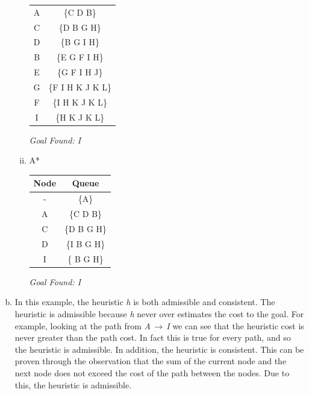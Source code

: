 \documentclass[12pt]{article}%
\begin{document}
\begin{enumerate}[(a)]
\begin{enumerate}[i.]
\begin{center}
\begin{tabular}{c | c}
            A & \{C D B\}  \\
            C & \{D B G H\}  \\
            D & \{B G I H\}  \\
            B & \{E G F I H\}  \\
            E & \{G F I H J\}  \\
            G & \{F I H K J K L\}  \\
            F & \{I H K J K L\}  \\
            I & \{H K J K L\}  \\ [1ex] %
            \hline %
        \end{tabular}\hfill\null
        \end{center}
        \begin{center}
            \textit{Goal Found: I}
        \end{center}
    \item
        A*
        \newline
        \begin{center}
        \hfill\begin{tabular}{c | c} %
            \hline\hline %
            Node & Queue \\ [0.5ex] %
            \hline %
            - & \{A\}  \\ %
            A & \{C D B\}  \\
            C & \{D B G H\}  \\
            D & \{I B G H\}  \\
            I & \{ B G H\}  \\ [1ex] %
            \hline %
        \end{tabular}\hfill\null
        \newline
        \end{center}
        \begin{center}
            \textit{Goal Found: I}
        \end{center}
  \end{enumerate}
  \item
  In this example, the heuristic \textit{h} is both admissible and consistent. The heuristic is admissible because \textit{h} never over estimates the cost to the goal. For example, looking at the path from \textit{A}$\,\to\,$\textit{I} we can see that the heuristic cost is never greater than the path cost. In fact this is true for every path, and so the heuristic is admissible. In addition, the heuristic is consistent. This can be proven through the observation that the sum of the current node and the next node does not exceed the cost of the path between the nodes. Due to this, the heuristic is admissible.

\end{enumerate}
\end{document}
